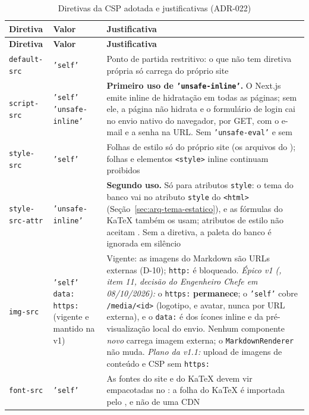 \begingroup\small
\begin{longtable}{@{}L{2.8cm}L{3.3cm}L{7.1cm}@{}}
\caption{Diretivas da CSP adotada e justificativas (ADR-022)}\label{tab:csp-diretivas}\\
\toprule
\textbf{Diretiva} & \textbf{Valor} & \textbf{Justificativa}\\
\midrule
\endfirsthead
\toprule
\textbf{Diretiva} & \textbf{Valor} & \textbf{Justificativa}\\
\midrule
\endhead
\bottomrule
\endfoot
\texttt{default-src} & \texttt{'self'} & Ponto de partida restritivo: o que não tem diretiva própria só carrega do próprio site\\
\addlinespace
\texttt{script-src} & \texttt{'self' 'unsafe-inline'} & \textbf{Primeiro uso de \texttt{'unsafe-inline'}.} O Next.js emite  inline de hidratação em todas as páginas; sem ele, a página não hidrata e o formulário de login cai no envio nativo do navegador, por GET, com o e-mail e a senha na URL. Sem \texttt{'unsafe-eval'} e sem \\
\addlinespace
\texttt{style-src} & \texttt{'self'} & Folhas de estilo só do próprio site (os arquivos do ); folhas e elementos \texttt{<style>} inline continuam proibidos\\
\addlinespace
\texttt{style-src-attr} & \texttt{'unsafe-inline'} & \textbf{Segundo uso.} Só para atributos \texttt{style}: o tema do banco vai no atributo \texttt{style} do \texttt{<html>} (Seção~\ref{sec:arq-tema-estatico}), e as fórmulas do KaTeX também os usam; atributos de estilo não aceitam . Sem a diretiva, a paleta do banco é ignorada em silêncio\\
\addlinespace
\texttt{img-src} & \texttt{'self' data: https:} (vigente e mantido na v1) & Vigente: as imagens do Markdown são URLs externas (D-10); \texttt{http:} é bloqueado. \emph{Épico v1 (, item 11, decisão do Engenheiro Chefe em 08/10/2026):} o \texttt{https:} \textbf{permanece}; o \texttt{'self'} cobre \texttt{/media/<id>} (logotipo,  e avatar, nunca por URL externa), e o \texttt{data:} é dos ícones inline e da pré-visualização local do envio. Nenhum componente \emph{novo} carrega imagem externa; o \texttt{MarkdownRenderer} não muda. \emph{Plano da v1.1:} upload de imagens de conteúdo e CSP sem \texttt{https:}\\
\addlinespace
\texttt{font-src} & \texttt{'self'} & As fontes do site e do KaTeX devem vir empacotadas no : a folha do KaTeX é importada pelo , e não de uma CDN\\

\end{longtable}
